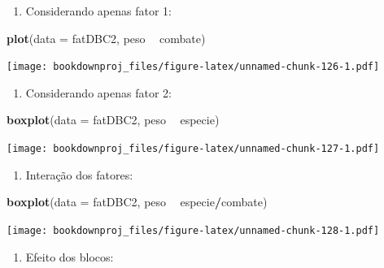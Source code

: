 \documentclass[
]{article}
\newenvironment{Shaded}{\begin{snugshade}}{\end{snugshade}}
\newcommand{\DataTypeTok}[1]{\textcolor[rgb]{0.13,0.29,0.53}{#1}}
\newcommand{\KeywordTok}[1]{\textcolor[rgb]{0.13,0.29,0.53}{\textbf{#1}}}
\newcommand{\NormalTok}[1]{#1}
\newcommand{\OperatorTok}[1]{\textcolor[rgb]{0.81,0.36,0.00}{\textbf{#1}}}
\newcommand{\StringTok}[1]{\textcolor[rgb]{0.31,0.60,0.02}{#1}}
\providecommand{\tightlist}{%
  \setlength{\itemsep}{0pt}\setlength{\parskip}{0pt}}
\begin{document}
\begin{enumerate}
\def\labelenumi{\arabic{enumi}.}
\tightlist
\item
  Considerando apenas fator 1:
\end{enumerate}

\begin{Shaded}
\begin{Highlighting}[]
\KeywordTok{plot}\NormalTok{(}\DataTypeTok{data =}\NormalTok{ fatDBC2, peso }\OperatorTok{~}\StringTok{ }\NormalTok{combate)}
\end{Highlighting}
\end{Shaded}

\texttt{[image: bookdownproj\_files/figure-latex/unnamed-chunk-126-1.pdf]}

\begin{enumerate}
\def\labelenumi{\arabic{enumi}.}
\setcounter{enumi}{1}
\tightlist
\item
  Considerando apenas fator 2:
\end{enumerate}

\begin{Shaded}
\begin{Highlighting}[]
\KeywordTok{boxplot}\NormalTok{(}\DataTypeTok{data =}\NormalTok{ fatDBC2, peso }\OperatorTok{~}\StringTok{ }\NormalTok{especie)}
\end{Highlighting}
\end{Shaded}

\texttt{[image: bookdownproj\_files/figure-latex/unnamed-chunk-127-1.pdf]}

\begin{enumerate}
\def\labelenumi{\arabic{enumi}.}
\setcounter{enumi}{2}
\tightlist
\item
  Interação dos fatores:
\end{enumerate}

\begin{Shaded}
\begin{Highlighting}[]
\KeywordTok{boxplot}\NormalTok{(}\DataTypeTok{data =}\NormalTok{ fatDBC2, peso }\OperatorTok{~}\StringTok{ }\NormalTok{especie}\OperatorTok{/}\NormalTok{combate)}
\end{Highlighting}
\end{Shaded}

\texttt{[image: bookdownproj\_files/figure-latex/unnamed-chunk-128-1.pdf]}

\begin{enumerate}
\def\labelenumi{\arabic{enumi}.}
\setcounter{enumi}{3}
\tightlist
\item
  Efeito dos blocos:
\end{enumerate}
\end{document}
